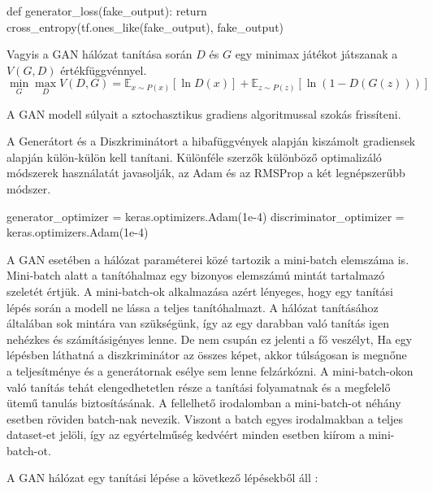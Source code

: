\begin{python}
def generator_loss(fake_output):
    return cross_entropy(tf.ones_like(fake_output), fake_output)
\end{python}

Vagyis a GAN hálózat tanítása során $D$ és $G$ egy minimax játékot játszanak a $V(G, D)$ értékfüggvénnyel.
$$\min_{G}\max_{D}V(D, G) =  \mathbb{E}_{x \sim P(x)} \left[\ln D(x) \right] + \mathbb{E}_{z \sim P(z)} \left[\ln(1 - D(G(z))) \right]$$

A GAN modell súlyait a sztochasztikus gradiens algoritmussal szokás frissíteni.

A Generátort és a Diszkriminátort a hibafüggvények alapján kiszámolt gradiensek alapján külön-külön kell tanítani. Különféle szerzők különböző optimalizáló módszerek használatát javasolják, az Adam \cite{kingma2014adam} és az RMSProp a két legnépszerűbb módszer.


\begin{python}
generator_optimizer = keras.optimizers.Adam(1e-4)
discriminator_optimizer = keras.optimizers.Adam(1e-4)
\end{python}


A GAN esetében a hálózat paraméterei közé tartozik a mini-batch elemszáma is. Mini-batch alatt a tanítóhalmaz egy bizonyos elemszámú mintát tartalmazó szeletét értjük. A mini-batch-ok alkalmazása azért lényeges, hogy egy tanítási lépés során a modell ne lássa a teljes tanítóhalmazt. A hálózat tanításához általában sok mintára van szükségünk, így az egy darabban való tanítás igen nehézkes és számításigényes lenne. De nem csupán ez jelenti a fő veszélyt, Ha egy lépésben láthatná a diszkriminátor az összes képet, akkor túlságosan is megnőne a teljesítménye és a generátornak esélye sem lenne felzárkózni. A mini-batch-okon való tanítás tehát elengedhetetlen része a tanítási folyamatnak és a megfelelő ütemű tanulás biztosításának.
A fellelhető irodalomban a mini-batch-ot néhány esetben röviden batch-nak nevezik. Viszont a batch egyes irodalmakban a teljes dataset-et jelöli, így az egyértelműség kedvéért minden esetben kiírom a mini-batch-ot.


A GAN hálózat egy tanítási lépése a következő lépésekből áll \cite{goodfellow2014generative}:

